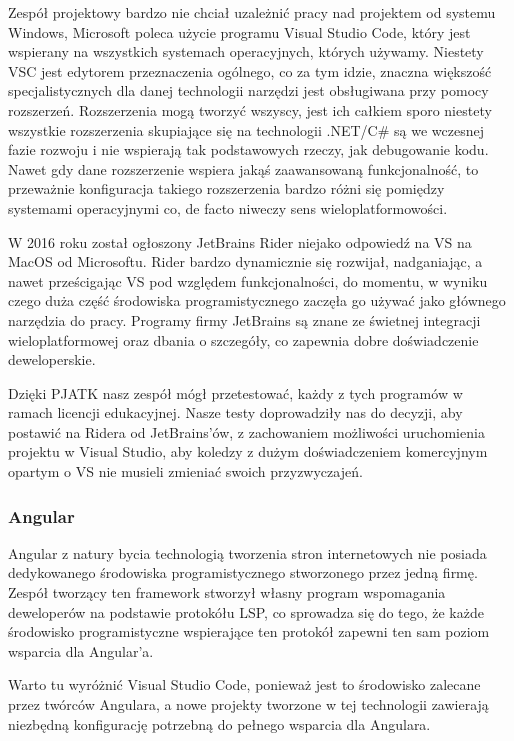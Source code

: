 Zespół projektowy bardzo nie chciał uzależnić pracy nad projektem od systemu Windows, Microsoft poleca użycie programu Visual Studio Code, który jest wspierany na wszystkich systemach operacyjnych, których używamy.
Niestety VSC jest edytorem przeznaczenia ogólnego, co za tym idzie, znaczna większość specjalistycznych dla danej technologii narzędzi jest obsługiwana przy pomocy rozszerzeń.
Rozszerzenia mogą tworzyć wszyscy, jest ich całkiem sporo niestety wszystkie rozszerzenia skupiające się na technologii .NET/C\# są we wczesnej fazie rozwoju i nie wspierają tak podstawowych rzeczy, jak debugowanie kodu.
Nawet gdy dane rozszerzenie wspiera jakąś zaawansowaną funkcjonalność, to przeważnie konfiguracja takiego rozszerzenia bardzo różni się pomiędzy systemami operacyjnymi co, de facto niweczy sens wieloplatformowości.


W 2016 roku został ogłoszony JetBrains Rider niejako odpowiedź na VS na MacOS od Microsoftu.
Rider bardzo dynamicznie się rozwijał, nadganiając, a nawet prześcigając VS pod względem funkcjonalności, do momentu, w wyniku czego duża część środowiska programistycznego zaczęła go używać jako głównego narzędzia do pracy.
Programy firmy JetBrains są znane ze świetnej integracji wieloplatformowej oraz dbania o szczegóły, co zapewnia dobre doświadczenie deweloperskie.


Dzięki PJATK nasz zespół mógł przetestować, każdy z tych programów w ramach licencji edukacyjnej.
Nasze testy doprowadziły nas do decyzji, aby postawić na Ridera od JetBrains'ów, z zachowaniem możliwości uruchomienia projektu w Visual Studio, aby koledzy z dużym doświadczeniem komercyjnym opartym o VS nie musieli zmieniać swoich przyzwyczajeń.

\subsubsection{Angular}
Angular z natury bycia technologią tworzenia stron internetowych nie posiada dedykowanego środowiska programistycznego stworzonego przez jedną firmę.
Zespół tworzący ten framework stworzył własny program wspomagania deweloperów na podstawie protokółu LSP, co sprowadza się do tego, że każde środowisko programistyczne wspierające ten protokół zapewni ten sam poziom wsparcia dla Angular'a.


Warto tu wyróżnić Visual Studio Code, ponieważ jest to środowisko zalecane przez twórców Angulara, a nowe projekty tworzone w tej technologii zawierają niezbędną konfigurację potrzebną do pełnego wsparcia dla Angulara.


